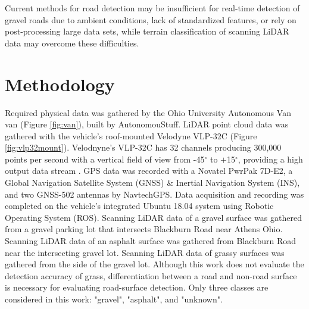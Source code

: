 \documentclass[journal,onecolumn]{IEEEtran}
\begin{document}
	{Current methods for road detection may be insufficient for real-time detection of gravel roads due to ambient conditions, lack of standardized features, or rely on post-processing large data sets, while terrain classification of scanning LiDAR data may overcome these difficulties.}

\section{Methodology}

	{Required physical data was gathered by the Ohio University Autonomous Van van (Figure \ref{fig:van}), built by AutonomouStuff. LiDAR point cloud data was gathered with the vehicle's roof-mounted Velodyne VLP-32C (Figure \ref{fig:vlp32mount}). Velodnyne's VLP-32C has 32 channels producing 300,000 points per second with a vertical field of view from -45$^{\circ}$ to $+$15$^{\circ}$, providing a high output data stream \cite{vlp_32c}. GPS data was recorded with a Novatel PwrPak 7D-E2, a Global Navigation Satellite System (GNSS) \& Inertial Navigation System (INS), and two GNSS-502 antennas by NavtechGPS. Data acquisition and recording was completed on the vehicle's integrated Ubuntu 18.04 system using Robotic Operating System (ROS). Scanning LiDAR data of a gravel surface was gathered from a gravel parking lot that intersects Blackburn Road near Athens Ohio. Scanning LiDAR data of an asphalt surface was gathered from Blackburn Road near the intersecting gravel lot. Scanning LiDAR data of grassy surfaces was gathered from the side of the gravel lot. Although this work does not evaluate the detection accuracy of grass, differentiation between a road and non-road surface is necessary for evaluating road-surface detection. Only three classes are considered in this work: "gravel", "asphalt", and "unknown". }
	
\end{document}
